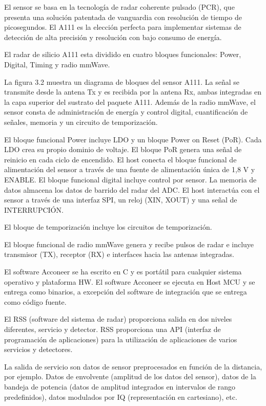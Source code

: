 El sensor se basa en la tecnología de radar coherente pulsado (PCR), que presenta una solución patentada de vanguardia con resolución de tiempo de picosegundos. El A111 es la elección perfecta para implementar sistemas de detección de alta precisión y resolución con bajo consumo de energía.

El radar de silicio A111 esta dividido en cuatro bloques funcionales: Power, Digital, Timing y radio mmWave.


La figura 3.2 muestra un diagrama de bloques del sensor A111. La señal se transmite desde la antena Tx y es recibida por la antena Rx, ambas integradas en la capa superior del sustrato del paquete A111. Además de la radio mmWave, el sensor consta de administración de energía y control digital, cuantificación de señales, memoria y un circuito de temporización.

El bloque funcional Power incluye LDO y un bloque Power on Reset (PoR). Cada LDO crea su propio dominio de voltaje. El bloque PoR genera una señal de reinicio en cada ciclo de encendido. El host conecta el bloque funcional de alimentación del sensor a través de una fuente de alimentación única de 1,8 V y ENABLE.
El bloque funcional digital incluye control por sensor. La memoria de datos almacena los datos de barrido del radar del ADC. El host interactúa con el sensor a través de una interfaz SPI, un reloj (XIN, XOUT) y una señal de INTERRUPCIÓN.

El bloque de temporización incluye los circuitos de temporización.

El bloque funcional de radio mmWave genera y recibe pulsos de radar e incluye transmisor (TX), receptor (RX) e interfaces hacia las antenas integradas.

El software Acconeer se ha escrito en C y es portátil para cualquier sistema operativo y plataforma HW. El software Acconeer se ejecuta en Host MCU y se entrega como binarios, a excepción del software de integración que se entrega como código fuente.

El RSS (software del sistema de radar) proporciona salida en dos niveles diferentes, servicio y detector. RSS proporciona una API (interfaz de programación de aplicaciones) para la utilización de aplicaciones de varios servicios y detectores.

La salida de servicio son datos de sensor preprocesados en función de la distancia, por ejemplo. Datos de envolvente (amplitud de los datos del sensor), datos de la bandeja de potencia (datos de amplitud integrados en intervalos de rango predefinidos), datos modulados por IQ (representación en cartesiano), etc.

